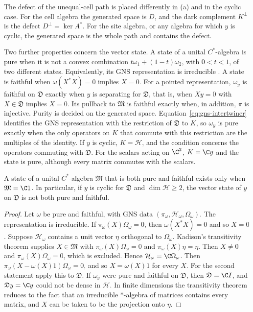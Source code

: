 The defect of the unequal-cell path is placed differently in (a) and in the cyclic case. For the cell algebra the generated space is $D$, and the dark complement $K^\perp$ is the defect $D^\perp=\ker A^*$. For the site algebra, or any algebra for which $y$ is cyclic, the generated space is the whole path and contains the defect.

Two further properties concern the vector state. A state of a unital $C^*$-algebra is pure when it is not a convex combination $t\omega_1+(1-t)\omega_2$, with $0<t<1$, of two different states. Equivalently, its GNS representation is irreducible \cite{BratteliRobinson}. A state is faithful when $\omega(X^*X)=0$ implies $X=0$. For a pointed representation, $\omega_y$ is faithful on $\mathfrak D$ exactly when $y$ is separating for $\mathfrak D$, that is, when $Xy=0$ with $X\in\mathfrak D$ implies $X=0$. Its pullback to $\mathfrak M$ is faithful exactly when, in addition, $\pi$ is injective. Purity is decided on the generated space. Equation~\eqref{eq:gns-intertwiner} identifies the GNS representation with the restriction of $\mathfrak D$ to $K$, so $\omega_y$ is pure exactly when the only operators on $K$ that commute with this restriction are the multiples of the identity. If $y$ is cyclic, $K=\mathcal H$, and the condition concerns the operators commuting with $\mathfrak D$. For the scalars acting on $\C^2$, $K=\C y$ and the state is pure, although every matrix commutes with the scalars.

\begin{proposition}
\label{prop:pure-faithful-scalars}
A state of a unital $C^*$-algebra $\mathfrak M$ that is both pure and faithful exists only when $\mathfrak M=\C1$. In particular, if $y$ is cyclic for $\mathfrak D$ and $\dim\mathcal H\geq2$, the vector state of $y$ on $\mathfrak D$ is not both pure and faithful.
\end{proposition}
\begin{proof}
Let $\omega$ be pure and faithful, with GNS data $(\pi_\omega,\mathcal H_\omega,\Omega_\omega)$. The representation is irreducible. If $\pi_\omega(X)\Omega_\omega=0$, then $\omega(X^*X)=0$ and so $X=0$. Suppose $\mathcal H_\omega$ contains a unit vector $\eta$ orthogonal to $\Omega_\omega$. Kadison's transitivity theorem \cite{Kadison1957} supplies $X\in\mathfrak M$ with $\pi_\omega(X)\Omega_\omega=0$ and $\pi_\omega(X)\eta=\eta$. Then $X\ne0$ and $\pi_\omega(X)\Omega_\omega=0$, which is excluded. Hence $\mathcal H_\omega=\C\Omega_\omega$. Then $\pi_\omega(X-\omega(X)1)\Omega_\omega=0$, and so $X=\omega(X)1$ for every $X$. For the second statement apply this to $\mathfrak D$. If $\omega_y$ were pure and faithful on $\mathfrak D$, then $\mathfrak D=\C I$, and $\mathfrak Dy=\C y$ could not be dense in $\mathcal H$. In finite dimensions the transitivity theorem reduces to the fact that an irreducible $*$-algebra of matrices contains every matrix, and $X$ can be taken to be the projection onto $\eta$.
\end{proof}

